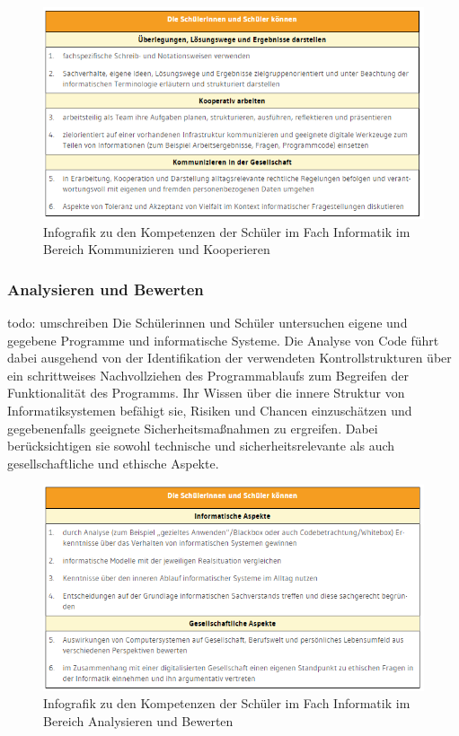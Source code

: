 \begin{figure}[H]
	\centering
	\includegraphics[width=\textwidth,height=\textheight,keepaspectratio]{images/team.png}
	\caption{Infografik zu den Kompetenzen der Schüler im Fach Informatik im Bereich Kommunizieren und Kooperieren}
	\label{Kommunizieren und Kooperieren Infografik}
\end{figure}

\subsubsection{Analysieren und Bewerten}
todo: umschreiben
Die Schülerinnen und Schüler untersuchen eigene und gegebene Programme und informatische Systeme. Die Analyse von Code führt dabei ausgehend von der Identifikation der verwendeten Kontrollstrukturen über ein schrittweises Nachvollziehen des Programmablaufs zum Begreifen der Funktionalität des Programms.
Ihr Wissen über die innere Struktur von Informatiksystemen befähigt sie, Risiken und Chancen einzuschätzen und gegebenenfalls geeignete Sicherheitsmaßnahmen zu ergreifen. Dabei berücksichtigen sie sowohl technische und sicherheitsrelevante als auch gesellschaftliche und ethische Aspekte\cite{Analy}.

\begin{figure}[H]
	\centering
	\includegraphics[width=\textwidth,height=\textheight,keepaspectratio]{images/Analysieren.png}
	\caption{Infografik zu den Kompetenzen der Schüler im Fach Informatik im Bereich Analysieren und Bewerten}
	\label{Analysieren und Bewerten Infografik}
\end{figure}

